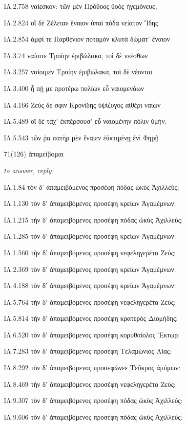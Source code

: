 \begin{enumerate}
{ΙΛ.2.758 ναίεσκον: τῶν μὲν Πρόθοος θοὸς ἡγεμόνευε, 

ΙΛ.2.824 οἳ δὲ Ζέλειαν ἔναιον ὑπαὶ πόδα νείατον Ἴδης 

ΙΛ.2.854 ἀμφί τε Παρθένιον ποταμὸν κλυτὰ δώματ' ἔναιον 

ΙΛ.3.74 ναίοιτε Τροίην ἐριβώλακα, τοὶ δὲ νεέσθων 

ΙΛ.3.257 ναίοιμεν Τροίην ἐριβώλακα, τοὶ δὲ νέονται 

ΙΛ.3.400 ἦ πῄ με προτέρω πολίων εὖ ναιομενάων 

ΙΛ.4.166 Ζεὺς δέ σφιν Κρονίδης ὑψίζυγος αἰθέρι ναίων 

ΙΛ.5.489 οἳ δὲ τάχ' ἐκπέρσουσ' εὖ ναιομένην πόλιν ὑμήν. 

ΙΛ.5.543 τῶν ῥα πατὴρ μὲν ἔναιεν ἐϋκτιμένῃ ἐνὶ Φηρῇ 

}

\clearpage
\item[\large 71(126) ]{\large \g ἀπαμείβομαι	}

\hspace{0.2cm} \textit{ to answer, reply }

{\g
ΙΛ.1.84 τὸν δ' ἀπαμειβόμενος προσέφη πόδας ὠκὺς Ἀχιλλεύς: 

ΙΛ.1.130 τὸν δ' ἀπαμειβόμενος προσέφη κρείων Ἀγαμέμνων: 

ΙΛ.1.215 τὴν δ' ἀπαμειβόμενος προσέφη πόδας ὠκὺς Ἀχιλλεύς: 

ΙΛ.1.285 τὸν δ' ἀπαμειβόμενος προσέφη κρείων Ἀγαμέμνων: 

ΙΛ.1.560 τὴν δ' ἀπαμειβόμενος προσέφη νεφεληγερέτα Ζεύς: 

ΙΛ.2.369 τὸν δ' ἀπαμειβόμενος προσέφη κρείων Ἀγαμέμνων: 

ΙΛ.4.188 τὸν δ' ἀπαμειβόμενος προσέφη κρείων Ἀγαμέμνων: 

ΙΛ.5.764 τὴν δ' ἀπαμειβόμενος προσέφη νεφεληγερέτα Ζεύς: 

ΙΛ.5.814 τὴν δ' ἀπαμειβόμενος προσέφη κρατερὸς Διομήδης: 

ΙΛ.6.520 τὸν δ' ἀπαμειβόμενος προσέφη κορυθαίολος Ἕκτωρ: 

ΙΛ.7.283 τὸν δ' ἀπαμειβόμενος προσέφη Τελαμώνιος Αἴας: 

ΙΛ.8.292 τὸν δ' ἀπαμειβόμενος προσεφώνεε Τεῦκρος ἀμύμων: 

ΙΛ.8.469 τὴν δ' ἀπαμειβόμενος προσέφη νεφεληγερέτα Ζεύς: 

ΙΛ.9.307 τὸν δ' ἀπαμειβόμενος προσέφη πόδας ὠκὺς Ἀχιλλεύς: 

ΙΛ.9.606 τὸν δ' ἀπαμειβόμενος προσέφη πόδας ὠκὺς Ἀχιλλεύς: 

}
\end{enumerate}
